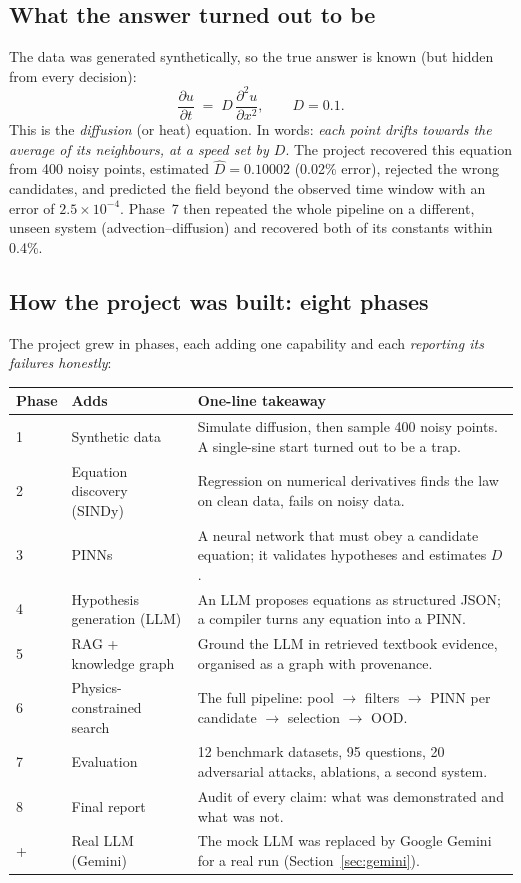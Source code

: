 \subsection{What the answer turned out to be}

The data was generated synthetically, so the true answer is known (but hidden from every decision):
\[
  \frac{\partial u}{\partial t} \;=\; D\,\frac{\partial^2 u}{\partial x^2}, \qquad D = 0.1 .
\]
This is the \emph{diffusion} (or heat) equation. In words: \emph{each point drifts towards the average of its
neighbours, at a speed set by $D$}. The project recovered this equation from 400 noisy points, estimated
$\hat D = 0.10002$ (0.02\% error), rejected the wrong candidates, and predicted the field beyond the observed
time window with an error of $2.5\times10^{-4}$. Phase~7 then repeated the whole pipeline on a different,
unseen system (advection--diffusion) and recovered both of its constants within 0.4\%.

\subsection{How the project was built: eight phases}

The project grew in phases, each adding one capability and each \emph{reporting its failures honestly}:

\begin{center}
\small
\begin{tabular}{@{}p{1.4cm}p{4.3cm}p{8.9cm}@{}}
\toprule
\textbf{Phase} & \textbf{Adds} & \textbf{One-line takeaway} \\ \midrule
1 & Synthetic data & Simulate diffusion, then sample 400 noisy points. A single-sine start turned out to be a trap. \\
2 & Equation discovery (SINDy) & Regression on numerical derivatives finds the law on clean data, fails on noisy data. \\
3 & PINNs & A neural network that must obey a candidate equation; it validates hypotheses and estimates $D$. \\
4 & Hypothesis generation (LLM) & An LLM proposes equations as structured JSON; a compiler turns any equation into a PINN. \\
5 & RAG + knowledge graph & Ground the LLM in retrieved textbook evidence, organised as a graph with provenance. \\
6 & Physics-constrained search & The full pipeline: pool $\to$ filters $\to$ PINN per candidate $\to$ selection $\to$ OOD. \\
7 & Evaluation & 12 benchmark datasets, 95 questions, 20 adversarial attacks, ablations, a second system. \\
8 & Final report & Audit of every claim: what was demonstrated and what was not. \\
+ & Real LLM (Gemini) & The mock LLM was replaced by Google Gemini for a real run (Section~\ref{sec:gemini}). \\
\bottomrule
\end{tabular}
\end{center}

